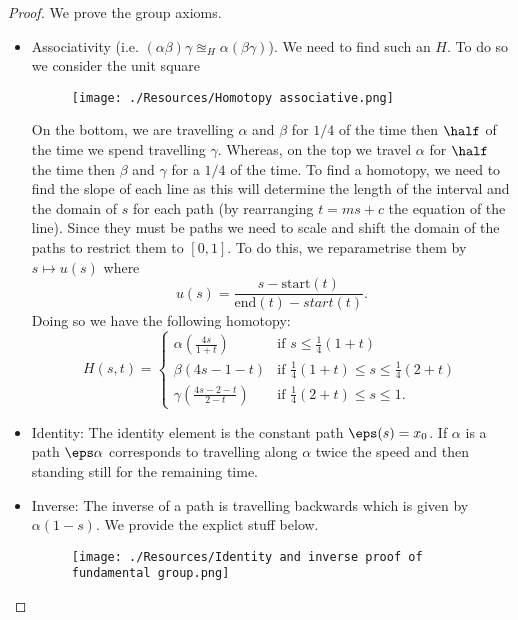 \documentclass[12pt, a4paper]{article}
\begin{document}
\begin{proof}
    We prove the group axioms.
    \begin{itemize}
        \item Associativity (i.e. \((\alpha\beta)\gamma \approxeq_H \alpha(\beta\gamma)\)). We need to find such an \(H\). To do so we consider the unit square 
        \begin{figure}[H]
             \begin{center}
                 \texttt{[image: ./Resources/Homotopy associative.png]}
             \end{center}
        \end{figure}
        On the bottom, we are travelling \(\alpha\) and \(\beta\) for \(1/4\) of the time then \(\half\) of the time we spend travelling \(\gamma\). Whereas, on the top we travel \(\alpha\) for \(\half\) the time then \(\beta\) and \(\gamma\) for a \(1/4\) of the time. To find a homotopy, we need to find the slope of each line as this will determine the length of the interval and the domain of \(s\) for each path (by rearranging \(t=ms+c\) the equation of the line). Since they must be paths we need to scale and shift the domain of the paths to restrict them to \([0,1]\). To do this, we reparametrise them by \(s \mapsto u(s)\) where 
        \[u(s) = \frac{s -\text{start}(t)}{\text{end}(t)-start(t)}.\] 
        Doing so we have the following homotopy:
        \[H(s,t) = \begin{cases}
            \alpha\left( \frac{4s}{1+t} \right) &\text{if } s\leq \frac{1}{4}(1+t) \\
            \beta(4s-1-t) &\text{if } \frac{1}{4}(1+t)\leq s \leq \frac{1}{4}(2+t) \\
            \gamma\left( \frac{4s-2-t}{2-t} \right) &\text{if } \frac{1}{4}(2+t) \leq s \leq 1.
        \end{cases}\]
        \item Identity: The identity element is the constant path \(\eps(s)=x_0\). If \(\alpha\) is a path \(\eps\alpha\) corresponds to travelling along \(\alpha\) twice the speed and then standing still for the remaining time.
        \item Inverse: The inverse of a path is travelling backwards which is given by \(\alpha(1-s)\).
        We provide the explict stuff below.
        \begin{figure}[H]
             \begin{center}
                 \texttt{[image: ./Resources/Identity and inverse proof of fundamental group.png]}
             \end{center}
        \end{figure}
    \end{itemize}
\end{proof}
\end{document}
